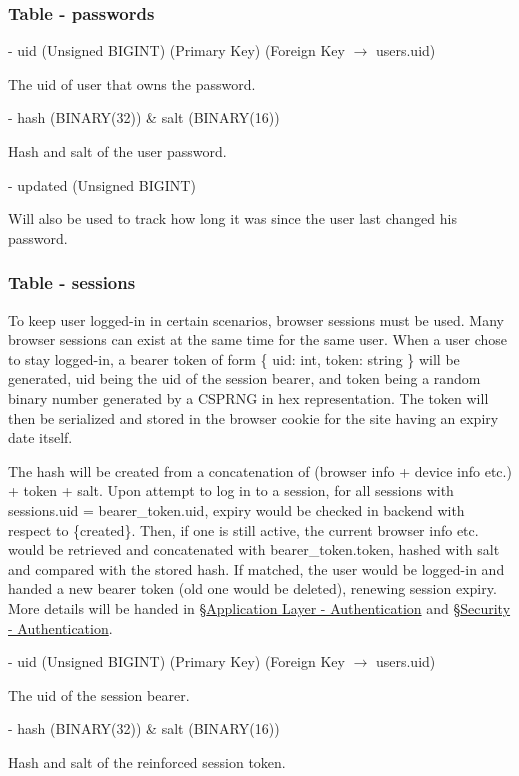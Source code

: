 \documentclass[12pt]{report}
\newcommand{\n}{\par}
\newcommand{\br}{\n\vspace{1 em}\n}
\begin{document}
\subsubsection{Table - passwords} \label{data-layer.design.user-system.passwords}
\br
- uid (Unsigned BIGINT) (Primary Key) (Foreign Key $\rightarrow$ users.uid)\n
The uid of user that owns the password.
\br
- hash (BINARY(32)) \& salt (BINARY(16))\n
Hash and salt of the user password.
\br
- updated (Unsigned BIGINT)\n
Will also be used to track how long it was since the user last changed his password.

\subsubsection{Table - sessions} \label{data-layer.design.user-system.sessions}
To keep user logged-in in certain scenarios, browser sessions must be used.
Many browser sessions can exist at the same time for the same user.
When a user chose to stay logged-in, a bearer token of form
\{ uid: int, token: string \}
will be generated,
uid being the uid of the session bearer, and
token being a random binary number generated by a CSPRNG in hex representation.
The token will then be serialized and stored in the browser cookie for the site having an expiry date itself.\n
The hash will be created from a concatenation of (browser info + device info etc.) + token + salt.
Upon attempt to log in to a session,
for all sessions with sessions.uid = bearer\_token.uid,
expiry would be checked in backend with respect to \{created\}.
Then, if one is still active, the current browser info etc. would be retrieved and concatenated with bearer\_token.token,
hashed with salt and compared with the stored hash.
If matched, the user would be logged-in and handed a new bearer token (old one would be deleted), renewing session expiry.
More details will be handed in \S \hyperref[application-layer.implementation.authentication]{Application Layer - Authentication} and
\S \hyperref[security.authentication]{Security - Authentication}.
\br
- uid (Unsigned BIGINT) (Primary Key) (Foreign Key $\rightarrow$ users.uid)\n
The uid of the session bearer.
\br
- hash (BINARY(32)) \& salt (BINARY(16))\n
Hash and salt of the reinforced session token.
\end{document}
